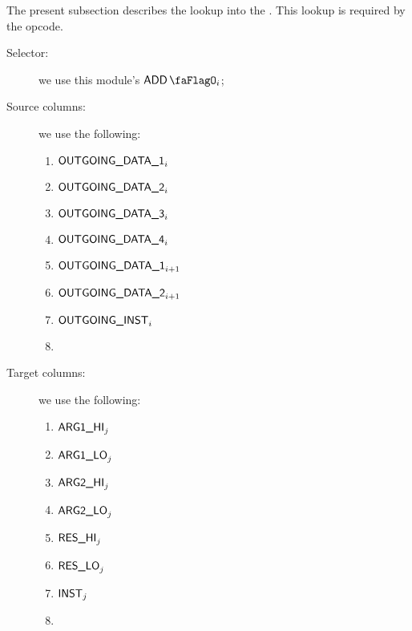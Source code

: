 The present subsection describes the lookup into the \addMod{}. This lookup is required by the  opcode.
\begin{description}
	\item[Selector:] we use this module's $\addFlag{}_{i}$;
	\item[Source columns:] we use the following:
		\begin{multicols}{2}
			\begin{enumerate}
				\item $\textsf{OUTGOING\_DATA\_1}_{i}$
				\item $\textsf{OUTGOING\_DATA\_2}_{i}$
				\item $\textsf{OUTGOING\_DATA\_3}_{i}$
				\item $\textsf{OUTGOING\_DATA\_4}_{i}$
				\item $\textsf{OUTGOING\_DATA\_1}_{i + 1}$
				\item $\textsf{OUTGOING\_DATA\_2}_{i + 1}$
				\item $\textsf{OUTGOING\_INST}_{i}$
				\item[\vspace{\fill}]
			\end{enumerate}
		\end{multicols}
	\item[Target columns:] we use the following:
		\begin{multicols}{2}
			\begin{enumerate}
				\item $\textsf{ARG}\textsf{1}\textsf{\_HI}_{j}$
				\item $\textsf{ARG}\textsf{1}\textsf{\_LO}_{j}$
				\item $\textsf{ARG}\textsf{2}\textsf{\_HI}_{j}$
				\item $\textsf{ARG}\textsf{2}\textsf{\_LO}_{j}$
				\item $\textsf{RES}\textsf{\_HI}_{j}$
				\item $\textsf{RES}\textsf{\_LO}_{j}$
				\item $\textsf{INST}_{j}$
				\item[\vspace{\fill}]
			\end{enumerate}
		\end{multicols}
\end{description}
